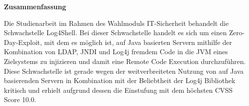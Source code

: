 
\textbf{\large Zusammenfassung}
\begin{justify}
Die Studienarbeit im Rahmen des Wahlmoduls IT-Sicherheit behandelt die Schwachstelle Log4Shell.
Bei dieser Schwachstelle handelt es sich um einen Zero-Day-Exploit, mit dem es möglich ist, auf Java basierten
Servern mithilfe der Kombination von LDAP, JNDI und Log4j fremdem Code in die JVM eines Zielsystems zu
injizieren und damit eine Remote Code Execution durchzuführen.
Diese Schwachstelle ist gerade wegen der weitverbreiteten
Nutzung von auf Java basierenden Servern in Kombination mit der Beliebtheit der Log4j Bibliothek kritisch und erhielt aufgrund dessen die Einstufung
mit dem höchsten CVSS Score 10.0.
\end{justify}

